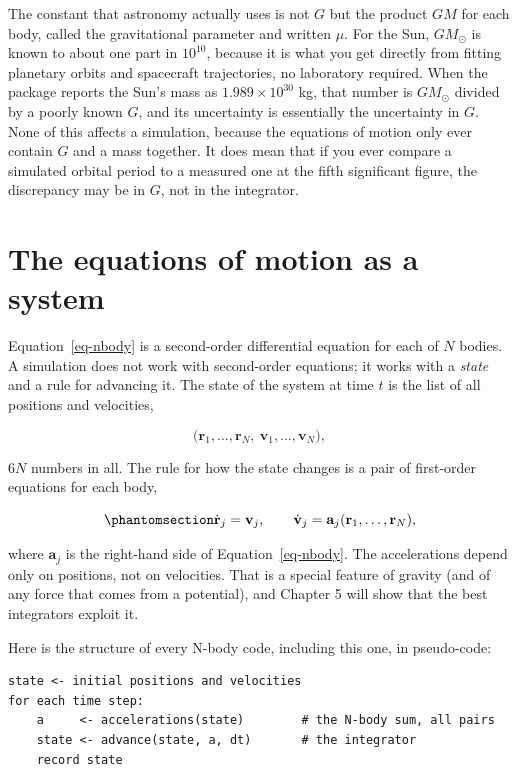\documentclass[
  10.5pt,
  letterpaper,
]{scrbook}
\theoremstyle{plain}
\theoremstyle{remark}
\begin{document}
The constant that astronomy actually uses is not \(G\) but the product
\(GM\) for each body, called the gravitational parameter and written
\(\mu\). For the Sun, \(GM_\odot\) is known to about one part in
\(10^{10}\), because it is what you get directly from fitting planetary
orbits and spacecraft trajectories, no laboratory required. When the
package reports the Sun's mass as \(1.989\times10^{30}\) kg, that number
is \(GM_\odot\) divided by a poorly known \(G\), and its uncertainty is
essentially the uncertainty in \(G\). None of this affects a simulation,
because the equations of motion only ever contain \(G\) and a mass
together. It does mean that if you ever compare a simulated orbital
period to a measured one at the fifth significant figure, the
discrepancy may be in \(G\), not in the integrator.

\section{The equations of motion as a
system}\label{the-equations-of-motion-as-a-system}

Equation~\ref{eq-nbody} is a second-order differential equation for each
of \(N\) bodies. A simulation does not work with second-order equations;
it works with a \emph{state} and a rule for advancing it. The state of
the system at time \(t\) is the list of all positions and velocities,

\[
\big(\mathbf{r}_1, \ldots, \mathbf{r}_N,\ \mathbf{v}_1, \ldots, \mathbf{v}_N\big),
\]

\(6N\) numbers in all. The rule for how the state changes is a pair of
first-order equations for each body,

\begin{equation}\protect\phantomsection\label{eq-state}{
\dot{\mathbf{r}}_j = \mathbf{v}_j, \qquad
\dot{\mathbf{v}}_j = \mathbf{a}_j(\mathbf{r}_1, \ldots, \mathbf{r}_N),
}\end{equation}

where \(\mathbf{a}_j\) is the right-hand side of
Equation~\ref{eq-nbody}. The accelerations depend only on positions, not
on velocities. That is a special feature of gravity (and of any force
that comes from a potential), and Chapter 5 will show that the best
integrators exploit it.

Here is the structure of every N-body code, including this one, in
pseudo-code:

\begin{verbatim}
state <- initial positions and velocities
for each time step:
    a     <- accelerations(state)        # the N-body sum, all pairs
    state <- advance(state, a, dt)       # the integrator
    record state
\end{verbatim}
\end{document}
